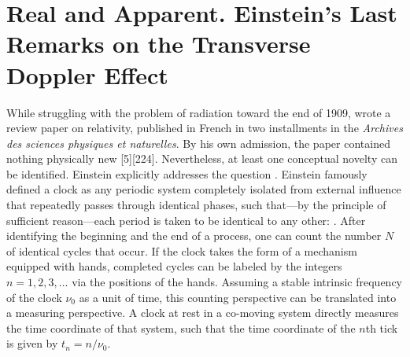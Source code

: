 \documentclass[pdflatex]{sn-jnl} %
\newcommand{\TDE}{Transverse Doppler Effect\xspace}
\providecommand{\DIFadd}[1]{{\protect\color{blue}\uwave{#1}}} %
\providecommand{\DIFdel}[1]{{\protect\color{red}\sout{#1}}}                      %
\providecommand{\DIFaddbegin}{} %
\providecommand{\DIFaddend}{} %
\providecommand{\DIFdelbegin}{} %
\providecommand{\DIFdelend}{} %
\begin{document}
\DIFdelbegin %
\DIFdelend \DIFaddbegin \section{Real and Apparent. Einstein’s Last Remarks on the \TDE}
\DIFaddend %
While struggling with the problem of radiation toward the end of 1909, \citet{Einstein1910} wrote a review paper on relativity, published in French in two installments in the \textit{Archives des sciences physiques et naturelles}. By his own admission, the paper contained nothing physically new [5][224]. Nevertheless, at least one conceptual novelty can be identified. Einstein explicitly addresses the question  \citep[21]{Einstein1910}. Einstein famously defined a clock as any periodic system completely isolated from external influence that repeatedly passes through identical phases, such that—by the principle of sufficient reason—each period is taken to be identical to any other:  \citep[21]{Einstein1910}. After identifying the beginning and the end of a process, one can count the number $N$ of identical cycles that occur. If the clock takes the form of a mechanism equipped with hands, completed cycles can be labeled by the integers $n=1,2,3,\ldots$ via the positions of the hands. Assuming a stable intrinsic frequency of the clock $\nu_0$ as a unit of time, this counting perspective can be translated into a measuring perspective. A clock at rest in a co-moving system directly measures the time coordinate of that system, such that the time coordinate of the $n$th tick is given by \DIFdelbegin \DIFdel{$t_n = n/\nu_0$}\DIFdelend \DIFaddbegin \DIFadd{$t'_n = n/\nu_0$}\DIFaddend .
\end{document}
